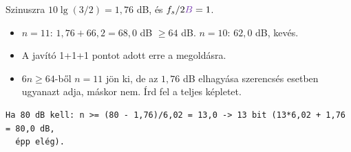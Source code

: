 Szinuszra $10\lg(3/2)=1{,}76$ dB, és $f_s/2{\cc{B}}=1$.

\begin{center}\end{center}

\begin{center}\end{center}

\begin{center}\end{center}
\begin{eredmeny}

\begin{center}\end{center}
\end{eredmeny}
\begin{tipp}[Ellenőrzés]
\begin{itemize}
\item $n=11$: $1{,}76+66{,}2=68{,}0$ dB $\ge64$ dB. $n=10$: $62{,}0$ dB, kevés.
\item A javító 1+1+1 pontot adott erre a megoldásra.
\end{itemize}
\end{tipp}
\begin{figyelem}
\begin{itemize}
\item $6n\ge64$-ből $n=11$ jön ki, de az $1{,}76$ dB elhagyása szerencsés esetben ugyanazt adja, máskor nem. Írd fel a teljes képletet.
\end{itemize}
\end{figyelem}
\begin{tipp}
\small
\begin{verbatim}
Ha 80 dB kell: n >= (80 - 1,76)/6,02 = 13,0 -> 13 bit (13*6,02 + 1,76 = 80,0 dB,
  épp elég).
\end{verbatim}
\end{tipp}



